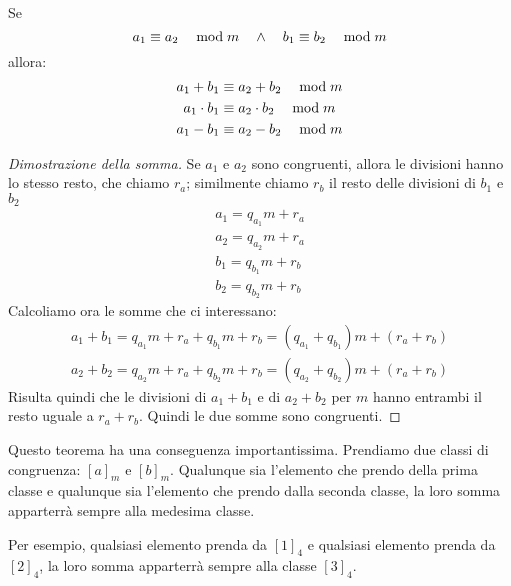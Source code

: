 \begin{mdframed}
    \begin{teorema}
        Se
        \begin{equation*}
             a_1 \equiv a_2 \quad\bmod m  \quad\land\quad  b_1 \equiv b_2 \quad\bmod m 
        \end{equation*}
        allora:
        \begin{gather*}
             a_1 + b_1 \equiv a_2 + b_2 \quad\bmod m  \\
             a_1 \cdot b_1 \equiv a_2 \cdot b_2 \quad\bmod m  \\
             a_1 - b_1 \equiv a_2 - b_2 \quad\bmod m  
        \end{gather*}
    \end{teorema}
    \begin{proof}[Dimostrazione della somma]
        Se $a_1$ e $a_2$ sono congruenti, allora le divisioni hanno lo stesso resto, che chiamo $r_a$;
        similmente chiamo $r_b$ il resto delle divisioni di $b_1$ e $b_2$
        \begin{gather*}
            a_1 = q_{a_1} m + r_a \\
            a_2 = q_{a_2} m + r_a \\
            b_1 = q_{b_1} m + r_b \\
            b_2 = q_{b_2} m + r_b 
        \end{gather*}
        Calcoliamo ora le somme che ci interessano:
        \begin{gather*}
            a_1 + b_1 = q_{a_1} m + r_a + q_{b_1} m + r_b = (q_{a_1} + q_{b_1}) m + (r_a + r_b) \\
            a_2 + b_2 = q_{a_2} m + r_a + q_{b_2} m + r_b = (q_{a_2} + q_{b_2}) m + (r_a + r_b) 
        \end{gather*}
        Risulta quindi che le divisioni di $a_1 + b_1$ e di $a_2 + b_2$ per $m$ hanno entrambi il resto uguale a $r_a + r_b$. Quindi le due somme sono congruenti.
    \end{proof}
\end{mdframed}

Questo teorema ha una conseguenza importantissima. Prendiamo due classi di congruenza: $[a]_m$ e $[b]_m$. Qualunque sia l'elemento che prendo della prima classe e qualunque sia l'elemento che prendo dalla seconda classe, la loro somma apparterrà sempre alla medesima classe.

Per esempio, qualsiasi elemento prenda da $[1]_4$ e qualsiasi elemento prenda da $[2]_4$, la loro somma apparterrà sempre alla classe $[3]_4$. 

